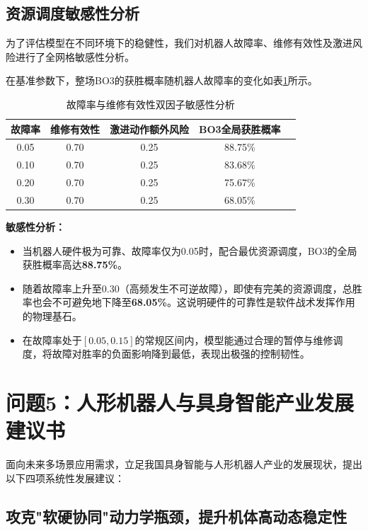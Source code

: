 \documentclass[a4paper,12pt]{article}
\numberwithin{equation}{section}
\numberwithin{table}{section}
\numberwithin{figure}{section}
\begin{document}
\subsection{资源调度敏感性分析}

为了评估模型在不同环境下的稳健性，我们对机器人故障率、维修有效性及激进风险进行了全网格敏感性分析。

在基准参数下，整场BO3的获胜概率随机器人故障率的变化如表\ref{tab:sensitivity}所示。

\begin{table}[H]
    \centering
    \caption{故障率与维修有效性双因子敏感性分析}
    \label{tab:sensitivity}
    \small
    \begin{tabular}{ccccc}
        \toprule
        故障率 & 维修有效性 & 激进动作额外风险 & BO3全局获胜概率 \\
        \midrule
        0.05 & 0.70 & 0.25 & 88.75\% \\
        0.10 & 0.70 & 0.25 & 83.68\% \\
        0.20 & 0.70 & 0.25 & 75.67\% \\
        0.30 & 0.70 & 0.25 & 68.05\% \\
        \bottomrule
    \end{tabular}
\end{table}

\textbf{敏感性分析：}
\begin{itemize}
    \item 当机器人硬件极为可靠、故障率仅为0.05时，配合最优资源调度，BO3的全局获胜概率高达\textbf{88.75\%}。
    \item 随着故障率上升至0.30（高频发生不可逆故障），即使有完美的资源调度，总胜率也会不可避免地下降至\textbf{68.05\%}。这说明硬件的可靠性是软件战术发挥作用的物理基石。
    \item 在故障率处于$[0.05, 0.15]$的常规区间内，模型能通过合理的暂停与维修调度，将故障对胜率的负面影响降到最低，表现出极强的控制韧性。
\end{itemize}

\section{问题5：人形机器人与具身智能产业发展建议书}

面向未来多场景应用需求，立足我国具身智能与人形机器人产业的发展现状，提出以下四项系统性发展建议：

\subsection{攻克"软硬协同"动力学瓶颈，提升机体高动态稳定性}
\end{document}
